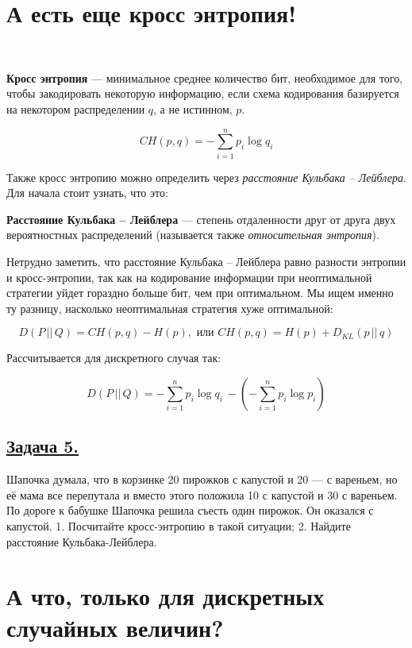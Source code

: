 \section*{А есть еще кросс энтропия!}~\
\\

\begin{siderules}
    \textbf{Кросс энтропия} --- минимальное среднее количество бит, необходимое для того, чтобы закодировать некоторую информацию, если схема кодирования базируется на некотором распределении $q$, а не истинном, $p$.
\end{siderules}

\[CH(p, q)=-\sum\limits_{i=1}^{n}p_i\log q_i \]

Также кросс энтропию можно определить через \textit{расстояние Кульбака -- Лейблера}. Для начала стоит узнать, что это:

\begin{siderules}
    \textbf{Расстояние Кульбака -- Лейблера} --- степень отдаленности друг от друга двух вероятностных распределений (называется также \textit{относительная энтропия}). \end{siderules}
    
    Нетрудно заметить, что расстояние Кульбака -- Лейблера равно разности энтропии и кросс-энтропии, так как на кодирование информации при неоптимальной стратегии уйдет гораздно больше бит, чем при оптимальном. Мы ищем именно ту разницу, насколько неоптимальная стратегия хуже оптимальной: 
    
    \[D(P\, ||\, Q)= CH(p,q) - H(p), \text{ или } CH(p, q)=H(p)+D_{KL}(p\, || \, q)\]
    
    Рассчитывается для дискретного случая так:

    \[D(P\, ||\, Q)=  - \sum\limits_{i=1}^n p_i\log q_i\ - ( - \sum\limits_{i=1}^n p_i\log p_i)\]



\subsection*{\hyperref[sec:sol_problem5]{Задача 5.}}\label{sec:problem5} Шапочка думала, что в корзинке 20 пирожков с капустой и 20 — с вареньем, но её мама все перепутала и вместо этого положила 10 с капустой и 30 с вареньем. По дороге к бабушке Шапочка решила съесть один пирожок. Он оказался с капустой. 
1.	Посчитайте кросс-энтропию в такой ситуации;
2.	Найдите расстояние Кульбака-Лейблера.

\section*{А что, только для дискретных случайных величин?}~\
\\

